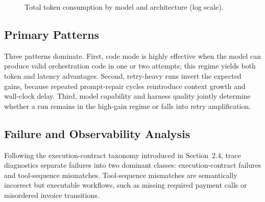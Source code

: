 \documentclass[journal,article,submit,pdftex,moreauthors]{Definitions/mdpi}
\begin{document}
\begin{figure}[H]
\centering
{}
\caption{Total token consumption by model and architecture (log scale).\label{fig:token_compare}}
\end{figure}

\subsection{Primary Patterns}

Three patterns dominate. First, code mode is highly effective when the model can produce valid orchestration code in one or two attempts; this regime yields both token and latency advantages. Second, retry-heavy runs invert the expected gains, because repeated prompt-repair cycles reintroduce context growth and wall-clock delay. Third, model capability and harness quality jointly determine whether a run remains in the high-gain regime or falls into retry amplification.

\subsection{Failure and Observability Analysis}

Following the execution-contract taxonomy introduced in Section~2.4, trace diagnostics separate failures into two dominant classes: execution-contract failures and tool-sequence mismatches. Tool-sequence mismatches are semantically incorrect but executable workflows, such as missing required payment calls or misordered invoice transitions.
\end{document}
